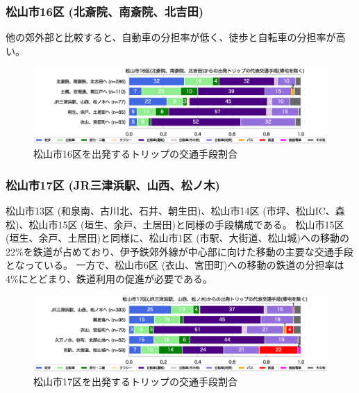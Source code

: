 \documentclass[a4paper,12pt, uplatex]{jsbook}
\begin{document}
\subsubsection{松山市16区 (北斎院、南斎院、北吉田)}
他の郊外部と比較すると、自動車の分担率が低く、徒歩と自転車の分担率が高い。
%
\begin{figure}[H]
    \centering
    \includegraphics[width=1.0\textwidth]{picture/mode_share_松山市16区.eps}
    \caption{松山市16区を出発するトリップの交通手段割合}
    \label{fig:mode_share_16}
\end{figure}

\subsubsection{松山市17区 (JR三津浜駅、山西、松ノ木)}
松山市13区 (和泉南、古川北、石井、朝生田)、松山市14区 (市坪、松山IC、森松)、松山市15区 (垣生、余戸、土居田)と同様の手段構成である。
松山市15区 (垣生、余戸、土居田)と同様に、松山市1区 (市駅、大街道、松山城)への移動の22\%を鉄道が占めており、伊予鉄郊外線が中心部に向けた移動の主要な交通手段となっている。
一方で、松山市6区 (衣山、宮田町)への移動の鉄道の分担率は4\%にとどまり、鉄道利用の促進が必要である。
%
\begin{figure}[H]
    \centering
    \includegraphics[width=1.0\textwidth]{picture/mode_share_松山市17区.eps}
    \caption{松山市17区を出発するトリップの交通手段割合}
    \label{fig:mode_share_17}
\end{figure}
\end{document}
